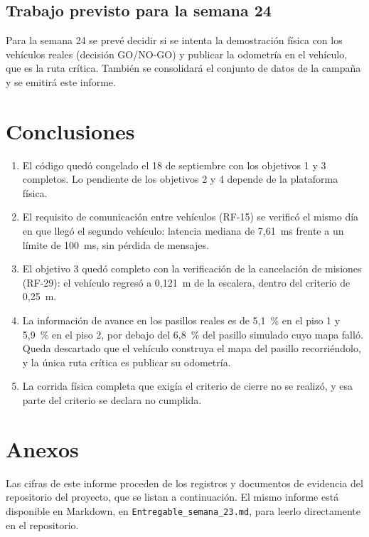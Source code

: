 \documentclass[12pt,letterpaper]{article}
\begin{document}
\subsection{Trabajo previsto para la semana 24}

Para la semana 24 se prevé decidir si se intenta la demostración física con los vehículos reales (decisión GO/NO-GO) y publicar la odometría en el vehículo, que es la ruta crítica. También se consolidará el conjunto de datos de la campaña y se emitirá este informe.

\section{Conclusiones}

\begin{enumerate}[leftmargin=*]
    \item El código quedó congelado el 18 de septiembre con los objetivos 1 y 3 completos. Lo pendiente de los objetivos 2 y 4 depende de la plataforma física.
    \item El requisito de comunicación entre vehículos (RF-15) se verificó el mismo día en que llegó el segundo vehículo: latencia mediana de 7,61~ms frente a un límite de 100~ms, sin pérdida de mensajes.
    \item El objetivo 3 quedó completo con la verificación de la cancelación de misiones (RF-29): el vehículo regresó a 0,121~m de la escalera, dentro del criterio de 0,25~m.
    \item La información de avance en los pasillos reales es de 5,1~\% en el piso 1 y 5,9~\% en el piso 2, por debajo del 6,8~\% del pasillo simulado cuyo mapa falló. Queda descartado que el vehículo construya el mapa del pasillo recorriéndolo, y la única ruta crítica es publicar su odometría.
    \item La corrida física completa que exigía el criterio de cierre no se realizó, y esa parte del criterio se declara no cumplida.
\end{enumerate}

\section{Anexos}

Las cifras de este informe proceden de los registros y documentos de evidencia del repositorio del proyecto, que se listan a continuación. El mismo informe está disponible en Markdown, en \texttt{Entregable\_semana\_23.md}, para leerlo directamente en el repositorio.
\end{document}
